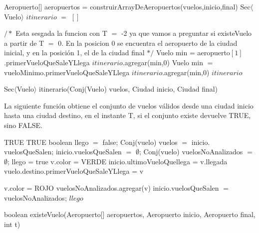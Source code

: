 \begin{algorithm}[H]
\begin{algorithmic}[1]
\STATE Aeropuerto[] aeropuertos = construirArrayDeAeropuertos(vuelos,inicio,final)
\STATE Sec$\langle$Vuelo$\rangle$ $itinerario$ $=$ $[]$

$/*$ Esta sesgada la funcion con T $=$ -2 ya que vamos a preguntar si existeVuelo a partir de T $=$ 0.
En la posicion 0 se encuentra el aeropuerto de la ciudad inicial, y en la posici\'on 1, el de la ciudad final $*/$
	\STATE Vuelo min = aeropuerto$[1]$.primerVueloQueSaleYLlega
\STATE $itinerario$.agregar(min,0)
	\STATE Vuelo min $=$ vueloMinimo.primerVueloQueSaleYLlega
	\STATE $itinerario$.agregar(min,0)
\ENDWHILE
\ENDIF
\RETURN $itinerario$
\caption{Sec$\langle$Vuelo$\rangle$ itinerario(Conj(Vuelo) vuelos, Ciudad inicio, Ciudad final)}%
\end{algorithmic}
\end{algorithm}

La siguiente funci\'on obtiene el conjunto de vuelos v\'alidos desde una ciudad inicio hasta una ciudad destino, en el instante T, si el conjunto existe devuelve TRUE, sino FALSE.

\begin{algorithm}[H]
\begin{algorithmic}[1]
		\RETURN TRUE
\ENDIF
{}	
		\RETURN TRUE
\ENDIF
\STATE boolean llego $=$ false;
\STATE Conj(vuelo) vuelos $=$ inicio$.$vuelosQueSalen;
\STATE inicio$.$vuelosQueSalen $=$ $\emptyset$;
\STATE Conj(vuelo) vuelosNoAnalizados $=$ $\emptyset$;
				\STATE llego = true
				\STATE v.color = VERDE
					\STATE inicio.ultimoVueloQuellega = v.llegada
				\ENDIF
					\STATE vuelo.destino.primerVueloQueSaleYLlega = v
				\ENDIF

			\ELSE
				\STATE v.color = ROJO								
	    		\ENDIF    			
		\ENDIF
	\ELSE
		\STATE vuelosNoAnalizados.agregar(v)										    
    \ENDIF
\ENDFOR
\STATE inicio$.$vuelosQueSalen $=$ vuelosNoAnalizados;
\RETURN $llego$
\caption{boolean existeVuelo(Aeropuerto[] aeropuertos, Aeropuerto inicio, Aeropuerto final, int t)}%
\end{algorithmic}
\end{algorithm}

